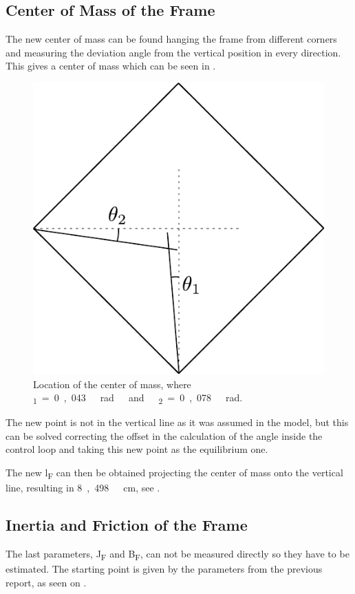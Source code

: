 \subsection{Center of Mass of the Frame}
The new center of mass can be found hanging the frame from different corners and measuring the deviation angle from the vertical position in every direction. This gives a center of mass which can be seen in . 
\begin{figure}[H]
	\centering
	\includegraphics[scale=0.6]{figures/centerOfMassDiagram}
	\caption{Location of the center of mass, where \si{\theta_1=0,043\ rad\ and\ \theta_2=0,078\ rad}.}
	\label{centerOfMassDiagram}
\end{figure}\vspace{-18pt}
%
The new point is not in the vertical line as it was assumed in the model, but this can be solved correcting the offset in the calculation of the angle inside the control loop and taking this new point as the equilibrium one. 

The new \si{l_F} can then be obtained projecting the center of mass onto the vertical line, resulting in \si{8,498\ cm}, see .

\subsection{Inertia and Friction of the Frame}
The last parameters, \si{J_F} and \si{B_F}, can not be measured directly so they have to be estimated. The starting point is given by the parameters from the previous report, as seen on  \cite{SVJohansen}.

